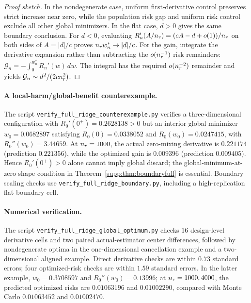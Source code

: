 \begin{proof}[Proof sketch]
In the nondegenerate case, uniform first-derivative control preserves strict increase near zero, while the population risk gap and uniform risk control exclude all other global minimizers. In the flat case, $d>0$ gives the same boundary conclusion. For $d<0$, evaluating $R_n'(A/n_r)=(cA-d+o(1))/n_r$ on both sides of $A=|d|/c$ proves $n_r w_n^*\to|d|/c$. For the gain, integrate the derivative expansion rather than subtracting the $o(n_r^{-1})$ risk remainders:
$\mathcal G_n=-\int_0^{w_n^*}R_n'(w)\,dw$. The integral has the required $o(n_r^{-2})$ remainder and yields $\mathcal G_n\sim d^2/(2cn_r^2)$.
\end{proof}

\paragraph{A local-harm/global-benefit counterexample.}
The script \texttt{verify\_full\_ridge\_counterexample.py} verifies a three-dimensional configuration with $R_0'(0^+)=0.2628138>0$ but an interior global minimizer $w_0=0.0682897$ satisfying $R_0(0)=0.0338052$ and $R_0(w_0)=0.0247415$, with $R_0''(w_0)=3.44659$. At $n_r=1000$, the actual zero-mixing derivative is $0.221174$ (prediction $0.221356$), while the optimized gain is $0.009396$ (prediction $0.009405$). Hence $R_0'(0^+)>0$ alone cannot imply global discard; the global-minimum-at-zero shape condition in Theorem~\ref{supp:thm:boundaryfull} is essential. Boundary scaling checks use \texttt{verify\_full\_ridge\_boundary.py}, including a high-replication flat-boundary cell.

\paragraph{Numerical verification.}
The script \texttt{verify\_full\_ridge\_global\_optimum.py} checks 16 design-level derivative cells and two paired actual-estimator center differences, followed by nondegenerate optima in the one-dimensional cancellation example and a two-dimensional aligned example. Direct derivative checks are within $0.73$ standard errors; four optimized-risk checks are within $1.59$ standard errors. In the latter example, $w_0=0.3708597$ and $R_0''(w_0)=0.13996$; at $n_r=1000,4000$, the predicted optimized risks are $0.01063196$ and $0.01002290$, compared with Monte Carlo $0.01063452$ and $0.01002470$.

